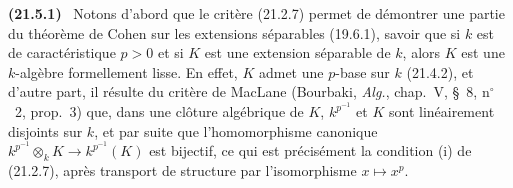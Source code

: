 \documentclass[10pt,oneside]{book}
\makeatletter
\newcommand{\setmanualcurrentlabel}[1]{\def\@currentlabel{#1}}
\newenvironment{env}[1][]{\setmanualcurrentlabel{#1}\par\medskip\noindent\textbf{(#1)}\ }{\par}
\makeatother
\begin{document}
\begin{env}[21.5.1]
\label{0.21.5.1-fr}
Notons d'abord que le critère (21.2.7) permet de démontrer une partie du
théorème de Cohen sur les extensions séparables (19.6.1), savoir que si $k$
est de caractéristique $p>0$ et si $K$ est une extension séparable de $k$,
alors $K$ est une $k$-algèbre formellement lisse. En effet, $K$ admet une
$p$-base sur $k$ (21.4.2), et d'autre part, il résulte du critère de MacLane
(Bourbaki, \emph{Alg.}, chap.~V, §~8, n$^\circ$~2, prop.~3) que, dans une
clôture algébrique de $K$, $k^{p^{-1}}$ et $K$ sont linéairement disjoints sur
$k$, et par suite que l'homomorphisme canonique
$k^{p^{-1}}\otimes_k K\to k^{p^{-1}}(K)$ est bijectif, ce qui est précisément
la condition (i) de (21.2.7), après transport de structure par
l'isomorphisme $x\mapsto x^p$.
\end{env}
\end{document}
